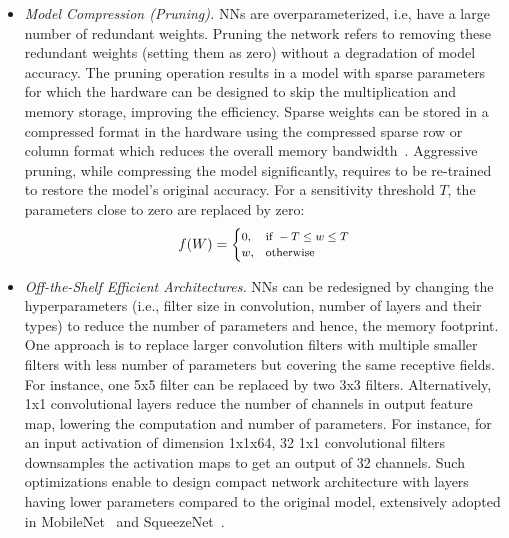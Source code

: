 \begin{itemize}[leftmargin=*]

\item {\em Model Compression (Pruning).}
NNs are overparameterized, i.e, have a large number of redundant weights.
Pruning the network refers to removing these redundant weights (setting them as zero) without a degradation of model accuracy.
The pruning operation results in a model with sparse parameters for which the hardware can be designed to skip the multiplication and memory storage, improving the efficiency.
Sparse weights can be stored in a compressed format in the hardware using the compressed sparse row or column format which reduces the overall memory bandwidth~\cite{DBLP:journals/corr/HanMD15,10.1109/ISCA.2016.30,Han:2015:LBW:2969239.2969366}.
Aggressive pruning, while compressing the model significantly, requires to be re-trained to restore the model's original accuracy.
For a sensitivity threshold $T$, the parameters close to zero are replaced by zero: %
\[
\footnotesize
    f(W)=
\begin{cases}
    0, & \text{if } -T \leq w \leq T\\
    w,  & \text{otherwise}
\end{cases}
\]

\item {\em Off-the-Shelf Efficient Architectures.}
NNs can be redesigned by changing the hyperparameters (i.e., filter size in convolution, number of layers and their types) to reduce the number of parameters and hence, the memory footprint.
One approach is to replace larger convolution filters with multiple smaller filters with less number of parameters but covering the same receptive fields.
For instance, one 5x5 filter can be replaced by two 3x3 filters.
Alternatively, 1x1 convolutional layers reduce the number of channels in output feature map, lowering the computation and number of parameters.
For instance, for an input activation of dimension 1x1x64, 32 1x1 convolutional filters downsamples the activation maps to get an output of 32 channels.
Such optimizations enable to design compact network architecture with layers having lower parameters compared to the original model, extensively adopted in MobileNet~\cite{conf/cvpr/SandlerHZZC18} and SqueezeNet~\cite{DBLP:journals/corr/IandolaMAHDK16}.



\end{itemize}
